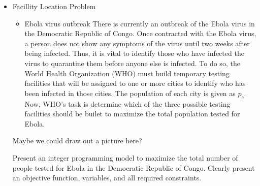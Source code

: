 \documentclass[12pt]{exam}
\newcommand{\answerbox}[3]{%
  \fbox{%
    \begin{minipage}[#1]{#2}
      \hfill\vspace{#3}
    \end{minipage}
  }
}
\newcommand{\answerboxone}[2]{%
  \answerbox{#1}{6.0in}{#2} 
}
\begin{document}
\begin{itemize}
\begin{parts}
\answerboxone{c}{1.5in}
\end{parts}


	\item Facillity Location Problem
	\begin{itemize}
		\item Ebola virus outbreak
There is currently an outbreak of the Ebola virus in the Democratic Republic of Congo. Once contracted with the Ebola virus, a person does not show any symptoms of the virus until two weeks after being infected. Thus, it is vital to identify those who have infected the virus to quarantine them before anyone else is infected. To do so, the World Health Organization (WHO) must build temporary testing facilities that will be assigned to one or more cities to identify who has been infected in those cities. The population of each city is given as $p_c$. Now, WHO's task is determine which of the three possible testing facilities should be builet to maximize the total population tested for Ebola.
	\end{itemize}

Maybe we could draw out a picture here?

Present an integer programming model to maximize the total number of people tested for Ebola in the Democratic Republic of Congo. Clearly present an objective function, variables, and all required constraints.

\end{itemize}
\end{document}
